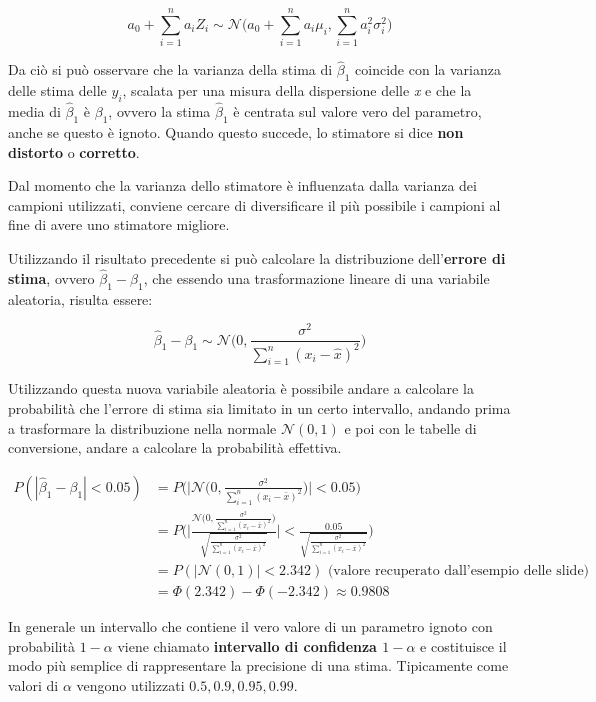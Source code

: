 $$
a_0 + \sum\limits_{i = 1}^n a_i Z_i \sim \mathcal{N}\bigg(a_0 + \sum\limits_{i=1}^n a_i\mu_i, \sum\limits_{i=1}^n a_{i}^2 \sigma_{i}^2\bigg)
$$

Da ciò si può osservare che la varianza della stima di $ \hat{\beta}_1  $ coincide con la varianza delle stima delle $ y_i $, scalata per una misura della dispersione delle \textit{x} e che la media di $ \hat{\beta}_1  $ è $ \beta_1 $, ovvero la stima $ \hat{\beta}_1  $ è centrata sul valore vero del parametro, anche se questo è ignoto. Quando questo succede, lo stimatore si dice \textbf{non distorto} o \textbf{corretto}. 

Dal momento che la varianza dello stimatore è influenzata dalla varianza dei campioni utilizzati, conviene cercare di diversificare il più possibile i campioni al fine di avere uno stimatore migliore.

Utilizzando il risultato precedente si può calcolare la distribuzione dell'\textbf{errore di stima}, ovvero $ \hat{\beta}_1  - \beta_1 $, che essendo una trasformazione lineare di una variabile aleatoria, risulta essere:

$$
\hat{\beta}_1 - \beta_1 \sim \mathcal{N}\Bigg(0, \frac{\sigma^2}{\sum_{i=1}^n (x_i - \hat{x})^2}\Bigg)
$$

Utilizzando questa nuova variabile aleatoria è possibile andare a calcolare la probabilità che l'errore di stima sia limitato in un certo intervallo, andando prima a trasformare la distribuzione nella normale $ \mathcal{N}(0,1) $ e poi con le tabelle di conversione, andare a calcolare la probabilità effettiva.

\begin{align*}
	P(|\hat{\beta}_1  - \beta_1| < 0.05) &= P\Bigg(\Bigg|\mathcal{N}\bigg(0, \frac{\sigma^2}{\sum_{i=1}^n (x_i - \bar{x})^2}\bigg)\Bigg| < 0.05\Bigg) \\
																  &= P\Bigg(\Bigg|\frac{\mathcal{N}\bigg(0, \frac{\sigma^2}{\sum_{i=1}^n (x_i - \bar{x})^2}\bigg)}{\sqrt{\frac{\sigma^2}{\sum_{i=1}^n (x_i - \bar{x})^2}}}\Bigg| < \frac{0.05}{\sqrt{\frac{\sigma^2}{\sum_{i=1}^n (x_i - \bar{x})^2}}}\Bigg) \\
																  &= P(|\mathcal{N}(0,1)| < 2.342) \text{ (valore recuperato dall'esempio delle slide)} \\
																  &= \Phi(2.342) - \Phi(-2.342) \approx 0.9808\
\end{align*}

In generale un intervallo che contiene il vero valore di un parametro ignoto con probabilità $ 1 - \alpha $ viene chiamato \textbf{intervallo di confidenza $ 1 - \alpha $} e costituisce il modo più semplice di rappresentare la precisione di una stima. Tipicamente come valori di $ \alpha $ vengono utilizzati $ 0.5, 0.9, 0.95, 0.99 $.

